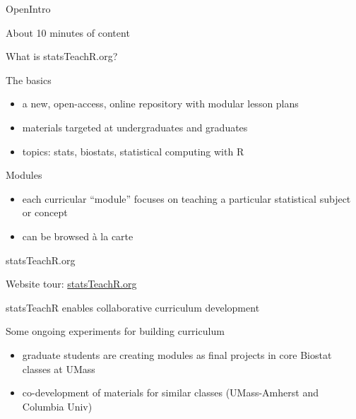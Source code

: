 \begin{frame}{OpenIntro}

About 10 minutes of content

\end{frame}



\begin{frame}{What is statsTeachR.org?}

\begin{block}{The basics}
\begin{itemize}
        \item a new, open-access, online repository with modular lesson plans
        \item materials targeted at undergraduates and graduates 
        \item topics: stats, biostats, statistical computing with R
\end{itemize}
\end{block}

\begin{block}{Modules}
\begin{itemize}
        \item each curricular ``module'' focuses on teaching a particular statistical subject or concept
        \item can be browsed \`a la carte
\end{itemize}
\end{block}

\end{frame}


\begin{frame}{statsTeachR.org}

Website tour: \href{http://statsTeachR.org}{statsTeachR.org}

\end{frame}


\begin{frame}{statsTeachR enables collaborative curriculum development}

\begin{block}{Some ongoing experiments for building curriculum}
\begin{itemize}
        \item graduate students are creating modules as final projects in core Biostat classes at UMass
        \item co-development of materials for similar classes (UMass-Amherst and Columbia Univ) 
\end{itemize}
\end{block}


\end{frame}

